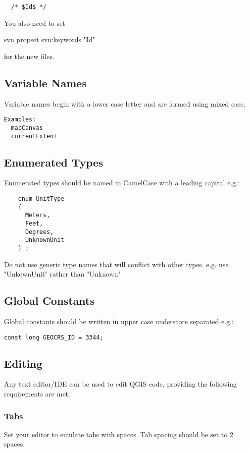 \begin{verbatim}
  /* $Id$ */
\end{verbatim}

You also need to set 

svn propset svn:keywords "Id"

for the new files.

\hypertarget{toc14}{}
\subsection{Variable Names}
Variable names begin with a lower case letter and are formed using mixed case.

\begin{verbatim}
Examples:
  mapCanvas
  currentExtent
\end{verbatim}

\hypertarget{toc15}{}
\subsection{Enumerated Types}
Enumerated types should be named in CamelCase with a leading capital e.g.:

\begin{verbatim}
    enum UnitType
    {
      Meters,
      Feet,
      Degrees,
      UnknownUnit
    } ;
\end{verbatim}

Do not use generic type names that will conflict with other types. e.g. use
"UnkownUnit" rather than "Unknown"

\hypertarget{toc16}{}
\subsection{Global Constants}
Global constants should be written in upper case underscore separated e.g.:

\begin{verbatim}
const long GEOCRS_ID = 3344;
\end{verbatim}

\hypertarget{toc17}{}
\subsection{Editing}
Any text editor/IDE can be used to edit QGIS code, providing the following
requirements are met.

\hypertarget{toc18}{}
\subsubsection{Tabs}
Set your editor to emulate tabs with spaces. Tab spacing should be set to 2
spaces.

